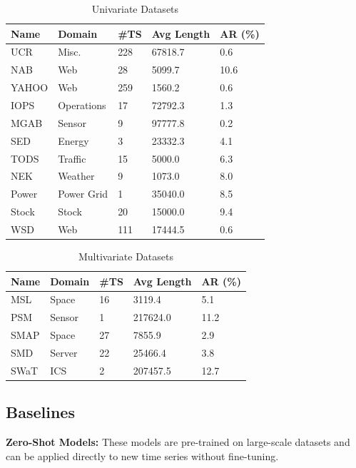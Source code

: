 \documentclass{article}
\theoremstyle{plain}
\theoremstyle{definition}
\theoremstyle{remark}
\begin{document}
\begin{table}[h!]
\centering
\caption{Univariate Datasets}\label{tab:univariate_datasets}
\begin{tabular}{lllll}
\toprule
\textbf{Name} & \textbf{Domain} & \textbf{\#TS} & \textbf{Avg Length} & \textbf{AR (\%)} \\
\midrule
UCR & Misc. & 228 & 67818.7 & 0.6 \\
NAB & Web & 28 & 5099.7 & 10.6 \\
YAHOO & Web & 259 & 1560.2 & 0.6 \\
IOPS & Operations & 17 & 72792.3 & 1.3 \\
MGAB & Sensor & 9 & 97777.8 & 0.2 \\
SED & Energy & 3 & 23332.3 & 4.1 \\
TODS & Traffic & 15 & 5000.0 & 6.3 \\
NEK & Weather & 9 & 1073.0 & 8.0 \\
Power & Power Grid & 1 & 35040.0 & 8.5 \\
Stock&Stock&20&15000.0&9.4\\
WSD&Web&111&17444.5&0.6\\
\bottomrule
\end{tabular}
\end{table}

\begin{table}[h!]
\centering
\caption{Multivariate Datasets}\label{tab:multivariate_datasets}
\begin{tabular}{lllll}
\toprule
\textbf{Name} & \textbf{Domain} & \textbf{\#TS} & \textbf{Avg Length} & \textbf{AR (\%)} \\
\midrule
MSL & Space & 16 & 3119.4 & 5.1 \\
PSM & Sensor & 1 & 217624.0 & 11.2 \\
SMAP & Space & 27 & 7855.9 & 2.9 \\
SMD & Server & 22 & 25466.4 & 3.8 \\
SWaT & ICS & 2 & 207457.5 & 12.7 \\
\bottomrule
\end{tabular}
\end{table}

\subsection{Baselines}\label{appendix:baselines}

\textbf{Zero-Shot Models:} These models are pre-trained on large-scale datasets and can be applied directly to new time series without fine-tuning.
\end{document}
